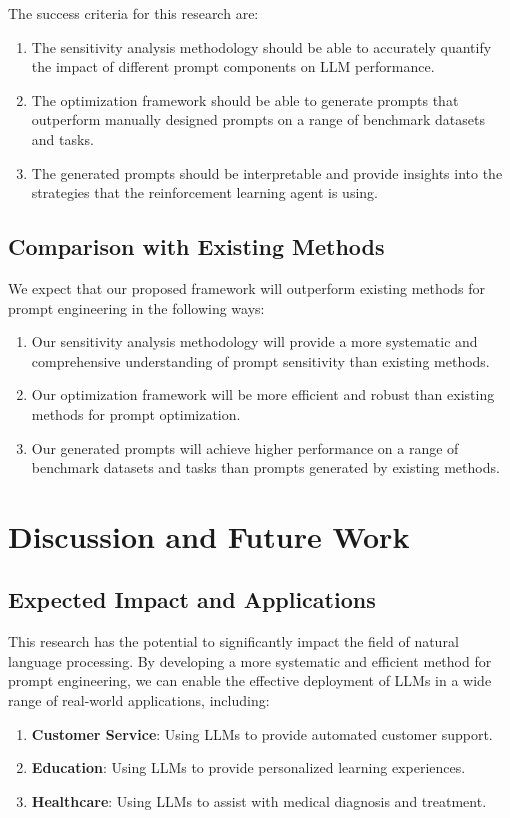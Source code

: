 \documentclass{article}
\begin{document}
The success criteria for this research are:
\begin{enumerate}
    \item The sensitivity analysis methodology should be able to accurately quantify the impact of different prompt components on LLM performance.
    \item The optimization framework should be able to generate prompts that outperform manually designed prompts on a range of benchmark datasets and tasks.
    \item The generated prompts should be interpretable and provide insights into the strategies that the reinforcement learning agent is using.
\end{enumerate}

\subsection{Comparison with Existing Methods}
We expect that our proposed framework will outperform existing methods for prompt engineering in the following ways:
\begin{enumerate}
    \item Our sensitivity analysis methodology will provide a more systematic and comprehensive understanding of prompt sensitivity than existing methods.
    \item Our optimization framework will be more efficient and robust than existing methods for prompt optimization.
    \item Our generated prompts will achieve higher performance on a range of benchmark datasets and tasks than prompts generated by existing methods.
\end{enumerate}

\section{Discussion and Future Work}
\label{sec:discussion}

\subsection{Expected Impact and Applications}
This research has the potential to significantly impact the field of natural language processing. By developing a more systematic and efficient method for prompt engineering, we can enable the effective deployment of LLMs in a wide range of real-world applications, including:
\begin{enumerate}
    \item \textbf{Customer Service}: Using LLMs to provide automated customer support.
    \item \textbf{Education}: Using LLMs to provide personalized learning experiences.
    \item \textbf{Healthcare}: Using LLMs to assist with medical diagnosis and treatment.
\end{enumerate}
\end{document}
